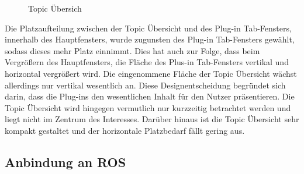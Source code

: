 \begin{figure}[t]
  \begin{center}
  \end{center}
  \caption{Topic Übersich}
  \label{fig:topics}
\end{figure}

Die Platzaufteilung zwischen der Topic Übersicht und des Plug-in Tab-Fensters,
innerhalb des Hauptfensters, wurde zugunsten des Plug-in Tab-Fensters gewählt,
sodass dieses mehr Platz einnimmt.  Dies hat auch zur Folge, dass beim Vergrößern
des Hauptfensters, die Fläche des Plus-in Tab-Fensters vertikal und horizontal
vergrößert wird. Die eingenommene Fläche der Topic Übersicht wächst allerdings
nur vertikal wesentlich an. Diese Designentscheidung begründet sich darin,
dass die Plug-ins den wesentlichen Inhalt für den Nutzer präsentieren. Die
Topic Übersicht wird hingegen vermutlich nur kurzzeitig betrachtet werden und
liegt nicht im Zentrum des Interesses. Darüber hinaus ist die Topic Übersicht
sehr kompakt gestaltet und der horizontale Platzbedarf fällt gering aus.



\subsection{Anbindung an ROS}

